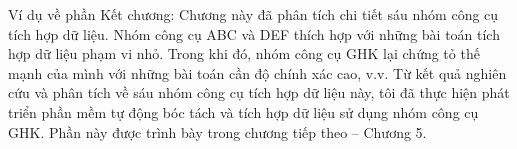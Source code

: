 \documentclass[../Main.tex]{subfiles}
\begin{document}
Ví dụ về phần Kết chương: Chương này đã phân tích chi tiết sáu nhóm công cụ tích hợp dữ liệu.
Nhóm công cụ ABC và DEF thích hợp với những bài toán tích hợp dữ liệu phạm vi nhỏ.
Trong khi đó, nhóm công cụ GHK lại chứng tỏ thế mạnh của mình với những bài toán cần độ chính xác cao, v.v.
Từ kết quả nghiên cứu và phân tích về sáu nhóm công cụ tích hợp dữ liệu này, tôi đã thực hiện phát triển phần mềm tự động bóc tách và tích hợp dữ liệu sử dụng nhóm công cụ GHK.
Phần này được trình bày trong chương tiếp theo – Chương 5.
\end{document}
